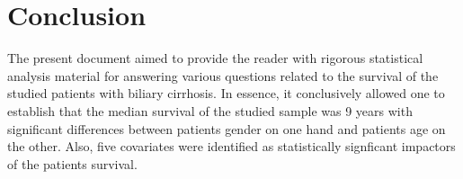 \documentclass[]{article}
\begin{document}
\section{Conclusion}\label{conclusion}

The present document aimed to provide the reader with rigorous
statistical analysis material for answering various questions related to
the survival of the studied patients with biliary cirrhosis. In essence,
it conclusively allowed one to establish that the median survival of the
studied sample was 9 years with significant differences between patients
gender on one hand and patients age on the other. Also, five covariates
were identified as statistically signficant impactors of the patients
survival.
\end{document}
